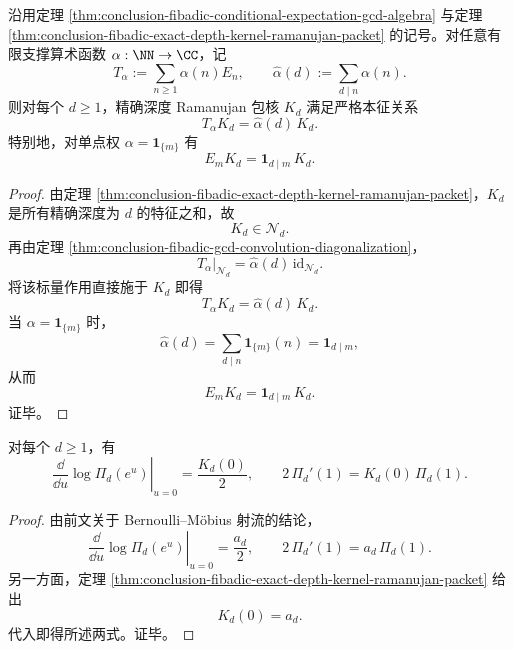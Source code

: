 \begin{theorem}\label{thm:conclusion-fibadic-ramanujan-packet-common-eigenpacket}
沿用定理 \ref{thm:conclusion-fibadic-conditional-expectation-gcd-algebra} 与定理 \ref{thm:conclusion-fibadic-exact-depth-kernel-ramanujan-packet} 的记号。对任意有限支撑算术函数 \(\alpha:\NN\to\CC\)，记
\[
T_\alpha:=\sum_{n\ge 1}\alpha(n)E_n,
\qquad
\widehat\alpha(d):=\sum_{d\mid n}\alpha(n).
\]
则对每个 \(d\ge 1\)，精确深度 Ramanujan 包核 \(K_d\) 满足严格本征关系
\[
T_\alpha K_d=\widehat\alpha(d)\,K_d.
\]
特别地，对单点权 \(\alpha=\mathbf 1_{\{m\}}\) 有
\[
E_mK_d=\mathbf 1_{d\mid m}\,K_d.
\]
\end{theorem}
\begin{proof}
由定理 \ref{thm:conclusion-fibadic-exact-depth-kernel-ramanujan-packet}，\(K_d\) 是所有精确深度为 \(d\) 的特征之和，故
\[
K_d\in \mathcal N_d.
\]
再由定理 \ref{thm:conclusion-fibadic-gcd-convolution-diagonalization}，
\[
T_\alpha|_{\mathcal N_d}=\widehat\alpha(d)\,\mathrm{id}_{\mathcal N_d}.
\]
将该标量作用直接施于 \(K_d\) 即得
\[
T_\alpha K_d=\widehat\alpha(d)\,K_d.
\]
当 \(\alpha=\mathbf 1_{\{m\}}\) 时，
\[
\widehat\alpha(d)=\sum_{d\mid n}\mathbf 1_{\{m\}}(n)=\mathbf 1_{d\mid m},
\]
从而
\[
E_mK_d=\mathbf 1_{d\mid m}\,K_d.
\]
证毕。
\end{proof}

\begin{corollary}\label{cor:conclusion-fibadic-bernoulli-jet-kd-zero-lock}
对每个 \(d\ge 1\)，有
\[
\left.\frac{\dd}{\dd u}\log \Pi_d(e^u)\right|_{u=0}=\frac{K_d(0)}{2},
\qquad
2\,\Pi_d'(1)=K_d(0)\,\Pi_d(1).
\]
\end{corollary}
\begin{proof}
由前文关于 Bernoulli--M\"obius 射流的结论，
\[
\left.\frac{\dd}{\dd u}\log \Pi_d(e^u)\right|_{u=0}=\frac{a_d}{2},
\qquad
2\,\Pi_d'(1)=a_d\,\Pi_d(1).
\]
另一方面，定理 \ref{thm:conclusion-fibadic-exact-depth-kernel-ramanujan-packet} 给出
\[
K_d(0)=a_d.
\]
代入即得所述两式。证毕。
\end{proof}
